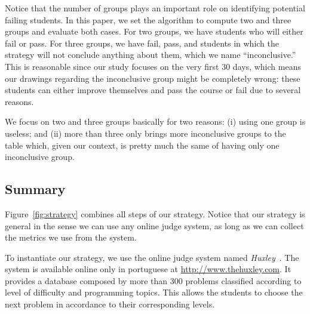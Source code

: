 Notice that the number of groups plays an important role on identifying potential failing students. In this paper, we set the algorithm to compute two and three groups and evaluate both cases. For two groups, we have students who will either fail or pass. For three groups, we have fail, pass, and students in which the strategy will not conclude anything about them, which we name ``inconclusive.'' This is reasonable since our study focuses on the very first 30 days, which means our drawings regarding the inconclusive group might be completely wrong: these students can either improve themselves and pass the course or fail due to several reasons.

We focus on two and three groups basically for two reasons: (i) using one group is useless; and (ii) more than three only brings more inconclusive groups to the table which, given our context, is pretty much the same of having only one inconclusive group.

\subsection{Summary}

Figure~\ref{fig:strategy} combines all steps of our strategy. Notice that our strategy is general in the sense we can use any online judge system, as long as we can collect the metrics we use from the system.


To instantiate our strategy, we use the online judge system named \textit{Huxley}~\cite{paes2013ferramenta}. The system is available online only in portuguese at \url{http://www.thehuxley.com}. It provides a database composed by more than 300 problems classified according to level of difficulty and programming topics. This allows the students to choose the next problem in accordance to their corresponding levels.




